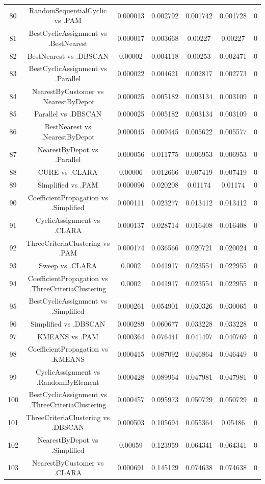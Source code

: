 \documentclass[a4paper,10pt]{article}
\begin{document}
\begin{landscape}
\begin{table}[!htp]
\begin{tabular}{ccccccc}
80&RandomSequentialCyclic vs .PAM&0.000013&0.002792&0.001742&0.001728&0\\
81&BestCyclicAssignment vs .BestNearest&0.000017&0.003668&0.00227&0.00227&0\\
82&BestNearest vs .DBSCAN&0.00002&0.004118&0.00253&0.002471&0\\
83&BestCyclicAssignment vs .Parallel&0.000022&0.004621&0.002817&0.002773&0\\
84&NearestByCustomer vs .NearestByDepot&0.000025&0.005182&0.003134&0.003109&0\\
85&Parallel vs .DBSCAN&0.000025&0.005182&0.003134&0.003109&0\\
86&BestNearest vs .NearestByDepot&0.000045&0.009445&0.005622&0.005577&0\\
87&NearestByDepot vs .Parallel&0.000056&0.011775&0.006953&0.006953&0\\
88&CURE vs .CLARA&0.00006&0.012666&0.007419&0.007419&0\\
89&Simplified vs .PAM&0.000096&0.020208&0.01174&0.01174&0\\
90&CoefficientPropagation vs .Simplified&0.000111&0.023277&0.013412&0.013412&0\\
91&CyclicAssignment vs .CLARA&0.000137&0.028714&0.016408&0.016408&0\\
92&ThreeCriteriaClustering vs .PAM&0.000174&0.036566&0.020721&0.020024&0\\
93&Sweep vs .CLARA&0.0002&0.041917&0.023554&0.022955&0\\
94&CoefficientPropagation vs .ThreeCriteriaClustering&0.0002&0.041917&0.023554&0.022955&0\\
95&BestCyclicAssignment vs .Simplified&0.000261&0.054901&0.030326&0.030065&0\\
96&Simplified vs .DBSCAN&0.000289&0.060677&0.033228&0.033228&0\\
97&KMEANS vs .PAM&0.000364&0.076441&0.041497&0.040769&0\\
98&CoefficientPropagation vs .KMEANS&0.000415&0.087092&0.046864&0.046449&0\\
99&CyclicAssignment vs .RandomByElement&0.000428&0.089964&0.047981&0.047981&0\\
100&BestCyclicAssignment vs .ThreeCriteriaClustering&0.000457&0.095973&0.050729&0.050729&0\\
101&ThreeCriteriaClustering vs .DBSCAN&0.000503&0.105694&0.055364&0.05486&0\\
102&NearestByDepot vs .Simplified&0.00059&0.123959&0.064341&0.064341&0\\
103&NearestByCustomer vs .CLARA&0.000691&0.145129&0.074638&0.074638&0\\

\end{tabular}
\end{table}
\end{landscape}
\end{document}
